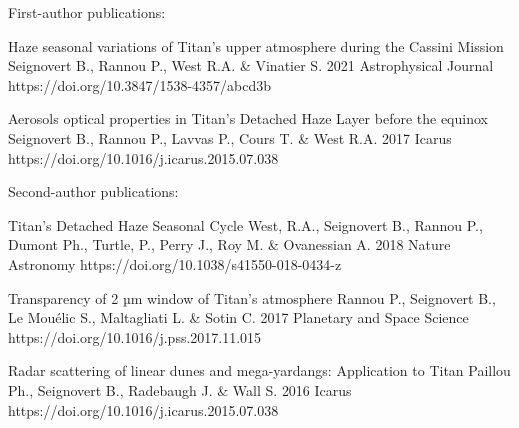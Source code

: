 
\begin{cvpublications}{First-author publications:}


	{Haze seasonal variations of Titan's upper atmosphere during the Cassini Mission}
	{Seignovert B., Rannou P., West R.A. \& Vinatier S.}
	{2021}
    {Astrophysical Journal}
	{https://doi.org/10.3847/1538-4357/abcd3b}

	{Aerosols optical properties in Titan's Detached Haze Layer before the equinox}
	{Seignovert B., Rannou P., Lavvas P., Cours T. \& West R.A.}
	{2017}
	{Icarus}
	{https://doi.org/10.1016/j.icarus.2015.07.038}

\end{cvpublications}

\begin{cvpublications}{Second-author publications:}


	{Titan's Detached Haze Seasonal Cycle}
	{West, R.A., Seignovert B., Rannou P., Dumont Ph., Turtle,  P., Perry J., Roy M. \& Ovanessian A.}
	{2018}
    {Nature Astronomy}
    {https://doi.org/10.1038/s41550-018-0434-z}

	{Transparency of 2 µm window of Titan’s atmosphere}
	{Rannou P., Seignovert B., Le Mouélic S., Maltagliati L. \& Sotin C.}
	{2017}
	{Planetary and Space Science}
	{https://doi.org/10.1016/j.pss.2017.11.015}

	{Radar scattering of linear dunes and mega-yardangs: Application to Titan}
	{Paillou Ph., Seignovert B., Radebaugh J. \& Wall S.}
	{2016}
	{Icarus}
	{https://doi.org/10.1016/j.icarus.2015.07.038}

\end{cvpublications}

